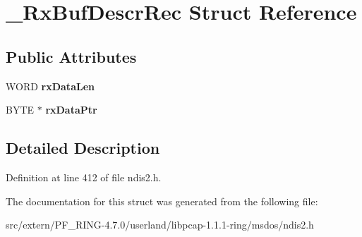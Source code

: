 \hypertarget{struct___rx_buf_descr_rec}{
\section{\_\-RxBufDescrRec Struct Reference}
\label{struct___rx_buf_descr_rec}
}
\subsection*{Public Attributes}
\begin{DoxyCompactItemize}
\item 
\hypertarget{struct___rx_buf_descr_rec_ac74a4cf142e58907e8a56949abe7eace}{
WORD {\bfseries rxDataLen}}
\label{struct___rx_buf_descr_rec_ac74a4cf142e58907e8a56949abe7eace}

\item 
\hypertarget{struct___rx_buf_descr_rec_ae57d061d475dd407103825689458abee}{
BYTE $\ast$ {\bfseries rxDataPtr}}
\label{struct___rx_buf_descr_rec_ae57d061d475dd407103825689458abee}

\end{DoxyCompactItemize}


\subsection{Detailed Description}


Definition at line 412 of file ndis2.h.



The documentation for this struct was generated from the following file:\begin{DoxyCompactItemize}
\item 
src/extern/PF\_\-RING-\/4.7.0/userland/libpcap-\/1.1.1-\/ring/msdos/ndis2.h\end{DoxyCompactItemize}

